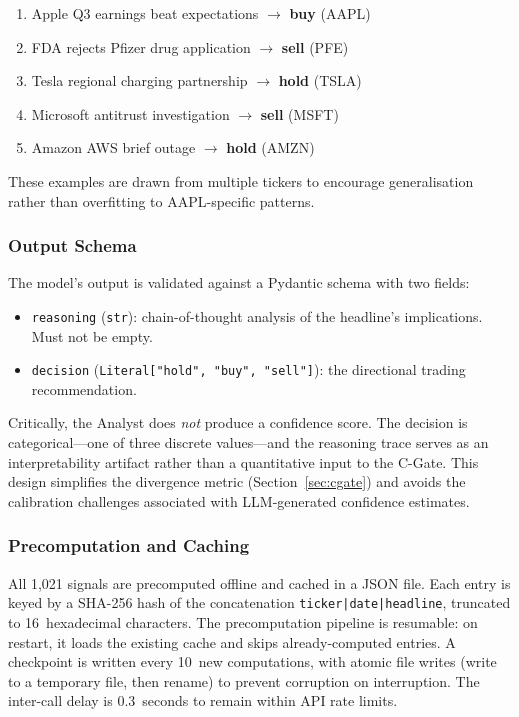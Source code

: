 \begin{enumerate}
    \item Apple Q3 earnings beat expectations $\rightarrow$ \textbf{buy} (AAPL)
    \item FDA rejects Pfizer drug application $\rightarrow$ \textbf{sell} (PFE)
    \item Tesla regional charging partnership $\rightarrow$ \textbf{hold} (TSLA)
    \item Microsoft antitrust investigation $\rightarrow$ \textbf{sell} (MSFT)
    \item Amazon AWS brief outage $\rightarrow$ \textbf{hold} (AMZN)
\end{enumerate}

These examples are drawn from multiple tickers to encourage generalisation
rather than overfitting to AAPL-specific patterns.

\subsubsection{Output Schema}

The model's output is validated against a Pydantic schema with two fields:

\begin{itemize}
    \item \texttt{reasoning} (\texttt{str}): chain-of-thought analysis of the
    headline's implications. Must not be empty.
    \item \texttt{decision} (\texttt{Literal["hold", "buy", "sell"]}): the
    directional trading recommendation.
\end{itemize}

Critically, the Analyst does \textit{not} produce a confidence score. The
decision is categorical---one of three discrete values---and the reasoning
trace serves as an interpretability artifact rather than a quantitative input to
the C-Gate. This design simplifies the divergence metric
(Section~\ref{sec:cgate}) and avoids the calibration challenges associated with
LLM-generated confidence estimates.

\subsubsection{Precomputation and Caching}

All 1{,}021 signals are precomputed offline and cached in a JSON file. Each
entry is keyed by a SHA-256 hash of the concatenation
\texttt{ticker|date|headline}, truncated to 16~hexadecimal characters. The
precomputation pipeline is resumable: on restart, it loads the existing cache
and skips already-computed entries. A checkpoint is written every 10~new
computations, with atomic file writes (write to a temporary file, then rename)
to prevent corruption on interruption. The inter-call delay is 0.3~seconds to
remain within API rate limits.

